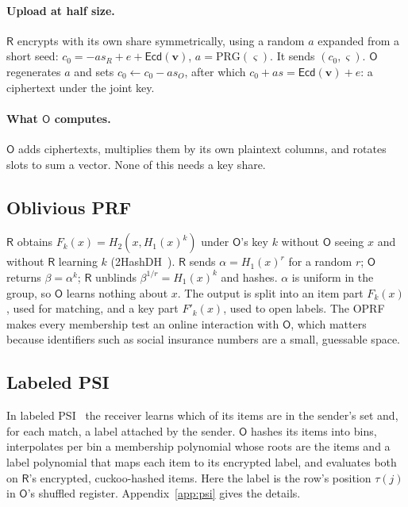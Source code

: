 \documentclass[11pt]{article}
\theoremstyle{definition}
\theoremstyle{plain}
\newcommand{\Ecd}{\mathsf{Ecd}}
\newcommand{\Party}[1]{\textsf{#1}}
\newcommand{\Rp}{\Party{R}}
\newcommand{\Op}{\Party{O}}
\begin{document}
\paragraph{Upload at half size.} $\Rp$ encrypts with its own share symmetrically, using a random $a$ expanded from a short seed: $c_0 = -a s_R + e + \Ecd(\mathbf v)$, $a = \mathrm{PRG}(\varsigma)$. It sends $(c_0, \varsigma)$. $\Op$ regenerates $a$ and sets $c_0 \gets c_0 - a s_O$, after which $c_0 + a s = \Ecd(\mathbf v) + e$: a ciphertext under the joint key.

\paragraph{What $\Op$ computes.} $\Op$ adds ciphertexts, multiplies them by its own plaintext columns, and rotates slots to sum a vector. None of this needs a key share.

\subsection{Oblivious PRF}
\label{sec:blocks:oprf}

$\Rp$ obtains $F_k(x) = H_2(x, H_1(x)^k)$ under $\Op$'s key $k$ without $\Op$ seeing $x$ and without $\Rp$ learning $k$ (2HashDH~\cite{jarecki2014round,rfc9497}). $\Rp$ sends $\alpha = H_1(x)^r$ for a random $r$; $\Op$ returns $\beta = \alpha^k$; $\Rp$ unblinds $\beta^{1/r} = H_1(x)^k$ and hashes. $\alpha$ is uniform in the group, so $\Op$ learns nothing about $x$. The output is split into an item part $F_k(x)$, used for matching, and a key part $F'_k(x)$, used to open labels. The OPRF makes every membership test an online interaction with $\Op$, which matters because identifiers such as social insurance numbers are a small, guessable space.

\subsection{Labeled PSI}
\label{sec:blocks:psi}

In labeled PSI~\cite{chen2017fast,chen2018labeled,cong2021labeled} the receiver learns which of its items are in the sender's set and, for each match, a label attached by the sender. $\Op$ hashes its items into bins, interpolates per bin a membership polynomial whose roots are the items and a label polynomial that maps each item to its encrypted label, and evaluates both on $\Rp$'s encrypted, cuckoo-hashed items. Here the label is the row's position $\tau(j)$ in $\Op$'s shuffled register. Appendix~\ref{app:psi} gives the details.
\end{document}
